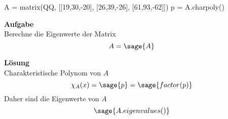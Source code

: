 \documentclass[DIV12,paper=A6,pagesize]{scrartcl}
\begin{document}
\Large

\begin{sagesilent}
A = matrix(QQ, [[19,30,-20], [26,39,-26], [61,93,-62]])
p = A.charpoly()
\end{sagesilent}

\textbf{Aufgabe}\\
Berechne die Eigenwerte der Matrix
\[ A = \sage{A} \]

\textbf{Lösung}\\
Charakteristische Polynom von $A$
\[ \chi_A(x) = \sage{p} = \sage{factor(p)} \]
Daher sind die Eigenwerte von $A$
\[ \sage{A.eigenvalues()} \]
\end{document}
